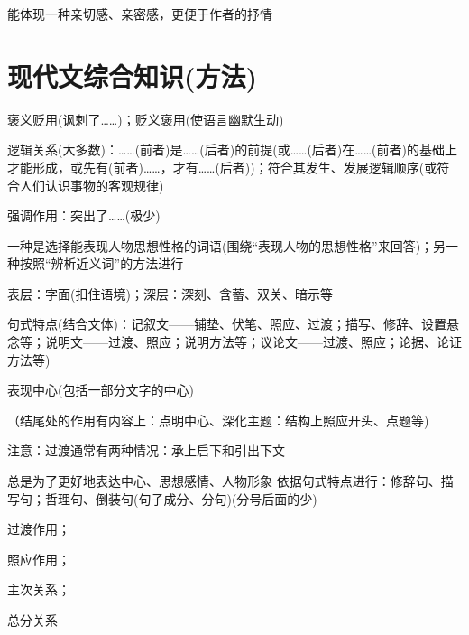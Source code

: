 能体现一种亲切感、亲密感，更便于作者的抒情

\section{现代文综合知识(方法)}

褒义贬用(讽刺了\ldots{}\ldots{})；贬义褒用(使语言幽默生动)

\begin{asparaenum}[(1)]
\item 逻辑关系(大多数)：\ldots{}\ldots{}(前者)是\ldots{}\ldots{}(后者)的前提(或\ldots{}\ldots{}(后者)在\ldots{}\ldots{}(前者)的基础上才能形成，或先有(前者)\ldots{}\ldots{}，才有\ldots{}\ldots{}(后者))；符合其发生、发展逻辑顺序(或符合人们认识事物的客观规律)
\item 强调作用：突出了\ldots{}\ldots{}(极少)
\end{asparaenum}

一种是选择能表现人物思想性格的词语(围绕``表现人物的思想性格''来回答)；另一种按照``辨析近义词''的方法进行

表层：字面(扣住语境)；深层：深刻、含蓄、双关、暗示等

\begin{asparaenum}[(1)]
\item 句式特点(结合文体)：记叙文——铺垫、伏笔、照应、过渡；描写、修辞、设置悬念等；说明文——过渡、照应；说明方法等；议论文——过渡、照应；论据、论证方法等)
\item 表现中心(包括一部分文字的中心)
\end{asparaenum}
（结尾处的作用有内容上：点明中心、深化主题：结构上照应开头、点题等)\par
注意：过渡通常有两种情况：承上启下和引出下文

总是为了更好地表达中心、思想感情、人物形象
依据句式特点进行：修辞句、描写句；哲理句、倒装句(句子成分、分句)(分号后面的少)


\begin{asparaenum}[(1)]
\item 过渡作用；
\item 照应作用；
\item 主次关系；
\item 总分关系
\end{asparaenum}

